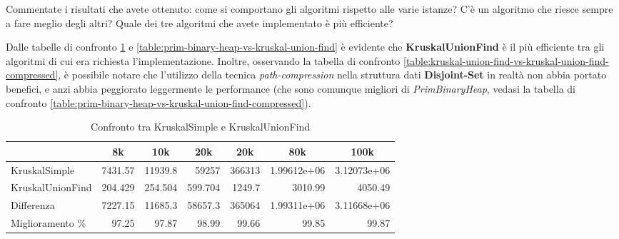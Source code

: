 \begin{displayquote}
Commentate i risultati che avete ottenuto: come si comportano gli algoritmi rispetto alle varie istanze? C'è un algoritmo che riesce sempre a fare meglio degli altri? Quale dei tre algoritmi che avete implementato è più efficiente?
\end{displayquote}

\noindent Dalle tabelle di confronto \ref{table:kruskal-simple-vs-kruskal-union-find} e \ref{table:prim-binary-heap-vs-kruskal-union-find} è evidente che \textbf{KruskalUnionFind} è il più efficiente tra gli algoritmi di cui era richiesta l'implementazione. Inoltre, osservando la tabella di confronto \ref{table:kruskal-union-find-vs-kruskal-union-find-compressed}, è possibile notare che l'utilizzo della tecnica \textit{path-compression} nella struttura dati \textbf{Disjoint-Set} in realtà non abbia portato benefici, e anzi abbia peggiorato leggermente le performance (che sono comunque migliori di \textit{PrimBinaryHeap}, vedasi la tabella di confronto \ref{table:prim-binary-heap-vs-kruskal-union-find-compressed}). \\

\begin{table}[H]
\centering
    \begin{tabular}{|l|rrrrrr|}
    \hline
    &  \multicolumn{1}{c}{8k} & \multicolumn{1}{c}{10k} & \multicolumn{1}{c}{20k} & \multicolumn{1}{c}{20k} & \multicolumn{1}{c}{80k} &           \multicolumn{1}{c|}{100k} \\
    \hline
     KruskalSimple     & 7431.57  & 11939.8   & 59257     & 366313    &    1.99612e+06 &    3.12073e+06 \\
     KruskalUnionFind &  204.429 &   254.504 &   599.704 &   1249.7  & 3010.99        & 4050.49        \\ \hline
     Differenza       & 7227.15  & 11685.3   & 58657.3   & 365064    &    1.99311e+06 &    3.11668e+06 \\
     Miglioramento \%    &   97.25  &    97.87  &    98.99  &     99.66 &   99.85        &   99.87        \\
    \hline
    \end{tabular}
    \caption{Confronto tra KruskalSimple e KruskalUnionFind}
    \label{table:kruskal-simple-vs-kruskal-union-find}
\end{table}

